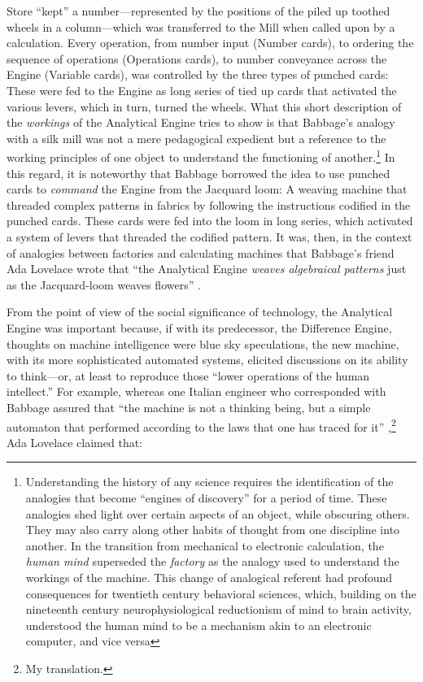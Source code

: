 \documentclass[version=last,draft=false,paper=A4,portrait,twoside=true,twocolumn=false,headinclude=false,footinclude=false,fontsize=12,BCOR=20mm,DIV=calc,pagesize=auto,titlepage=firstiscover,mpinclude=false,open=right,chapterprefix=true,numbers=autoendperiod,headsepline=false,headings=twolinechapter,parskip=false]{scrbook}
\begin{document}
Store ``kept'' a number---represented by the positions of the piled up
toothed wheels in a column---which was transferred to the Mill when called
upon by a calculation. Every operation, from number input (Number cards),
to ordering the sequence of operations (Operations cards), to number
conveyance across the Engine (Variable cards), was controlled by the three
types of punched cards: These were fed to the Engine as long series of tied
up cards that activated the various levers, which in turn, turned the
wheels. What this short description of the \emph{workings} of the Analytical
Engine tries to show is that Babbage's analogy with a silk mill was not a
mere pedagogical expedient but a reference to the working principles of one
object to understand the functioning of another.\footnote{Understanding the history of any science requires the
identification of the analogies that become ``engines of discovery'' for a
period of time. These analogies shed light over certain aspects of an
object, while obscuring others. They may also carry along other habits of
thought from one discipline into another. In the transition from mechanical
to electronic calculation, the \emph{human mind} superseded the \emph{factory} as the
analogy used to understand the workings of the machine. This change of
analogical referent had profound consequences for twentieth century
behavioral sciences, which, building on the nineteenth century
neurophysiological reductionism of mind to brain activity, understood the
human mind to be a mechanism akin to an electronic computer, and vice versa} In this regard, it
is noteworthy that Babbage borrowed the idea to use punched cards to
\emph{command} the Engine from the Jacquard loom: A weaving machine that threaded
complex patterns in fabrics by following the instructions codified in the
punched cards. These cards were fed into the loom in long series, which
activated a system of levers that threaded the codified pattern. It was,
then, in the context of analogies between factories and calculating
machines that Babbage's friend Ada Lovelace wrote that ``the Analytical
Engine \emph{weaves algebraical patterns} just as the Jacquard-loom weaves
flowers'' \autocite[25]{lovelace1843}.

From the point of view of the social significance of technology, the
Analytical Engine was important because, if with its predecessor, the
Difference Engine, thoughts on machine intelligence were blue sky
speculations, the new machine, with its more sophisticated automated
systems, elicited discussions on its ability to think---or, at least to
reproduce those ``lower operations of the human intellect.'' For example,
whereas one Italian engineer who corresponded with Babbage assured that
``the machine is not a thinking being, but a simple automaton that
performed according to the laws that one has traced for it''
\autocite[358]{menabrea1842},\footnote{My translation.} Ada Lovelace claimed that:
\end{document}
